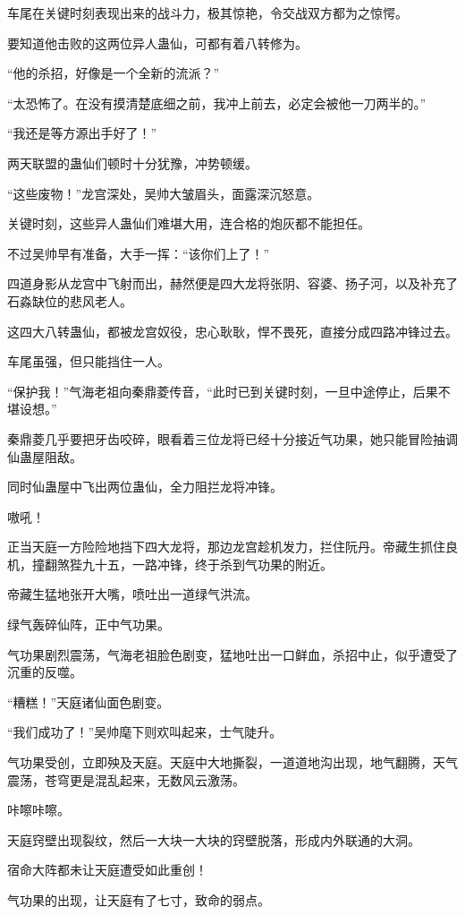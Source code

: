 \begin{this_body}
车尾在关键时刻表现出来的战斗力，极其惊艳，令交战双方都为之惊愕。

要知道他击败的这两位异人蛊仙，可都有着八转修为。

“他的杀招，好像是一个全新的流派？”

“太恐怖了。在没有摸清楚底细之前，我冲上前去，必定会被他一刀两半的。”

“我还是等方源出手好了！”

两天联盟的蛊仙们顿时十分犹豫，冲势顿缓。

“这些废物！”龙宫深处，吴帅大皱眉头，面露深沉怒意。

关键时刻，这些异人蛊仙们难堪大用，连合格的炮灰都不能担任。

不过吴帅早有准备，大手一挥：“该你们上了！”

四道身影从龙宫中飞射而出，赫然便是四大龙将张阴、容婆、扬子河，以及补充了石淼缺位的悲风老人。

这四大八转蛊仙，都被龙宫奴役，忠心耿耿，悍不畏死，直接分成四路冲锋过去。

车尾虽强，但只能挡住一人。

“保护我！”气海老祖向秦鼎菱传音，“此时已到关键时刻，一旦中途停止，后果不堪设想。”

秦鼎菱几乎要把牙齿咬碎，眼看着三位龙将已经十分接近气功果，她只能冒险抽调仙蛊屋阻敌。

同时仙蛊屋中飞出两位蛊仙，全力阻拦龙将冲锋。

嗷吼！

正当天庭一方险险地挡下四大龙将，那边龙宫趁机发力，拦住阮丹。帝藏生抓住良机，撞翻煞狴九十五，一路冲锋，终于杀到气功果的附近。

帝藏生猛地张开大嘴，喷吐出一道绿气洪流。

绿气轰碎仙阵，正中气功果。

气功果剧烈震荡，气海老祖脸色剧变，猛地吐出一口鲜血，杀招中止，似乎遭受了沉重的反噬。

“糟糕！”天庭诸仙面色剧变。

“我们成功了！”吴帅麾下则欢叫起来，士气陡升。

气功果受创，立即殃及天庭。天庭中大地撕裂，一道道地沟出现，地气翻腾，天气震荡，苍穹更是混乱起来，无数风云激荡。

咔嚓咔嚓。

天庭窍壁出现裂纹，然后一大块一大块的窍壁脱落，形成内外联通的大洞。

宿命大阵都未让天庭遭受如此重创！

气功果的出现，让天庭有了七寸，致命的弱点。


\end{this_body}
